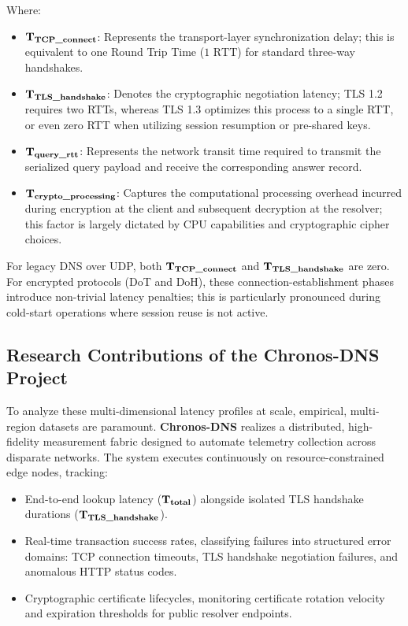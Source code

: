 \documentclass[10pt,journal,compsoc]{IEEEtran}
\begin{document}
Where:
\begin{itemize}
    \item $\mathbf{T_{\text{\textbf{TCP\_connect}}}}$: Represents the transport-layer synchronization delay; this is equivalent to one Round Trip Time ($1\text{ RTT}$) for standard three-way handshakes.
    \item $\mathbf{T_{\text{\textbf{TLS\_handshake}}}}$: Denotes the cryptographic negotiation latency; TLS 1.2 requires two RTTs, whereas TLS 1.3 optimizes this process to a single RTT, or even zero RTT when utilizing session resumption or pre-shared keys.
    \item $\mathbf{T_{\text{\textbf{query\_rtt}}}}$: Represents the network transit time required to transmit the serialized query payload and receive the corresponding answer record.
    \item $\mathbf{T_{\text{\textbf{crypto\_processing}}}}$: Captures the computational processing overhead incurred during encryption at the client and subsequent decryption at the resolver; this factor is largely dictated by CPU capabilities and cryptographic cipher choices.
\end{itemize}

For legacy DNS over UDP, both $\mathbf{T_{\text{\textbf{TCP\_connect}}}}$ and $\mathbf{T_{\text{\textbf{TLS\_handshake}}}}$ are zero. For encrypted protocols (DoT and DoH), these connection-establishment phases introduce non-trivial latency penalties; this is particularly pronounced during cold-start operations where session reuse is not active.

\subsection{Research Contributions of the Chronos-DNS Project}
To analyze these multi-dimensional latency profiles at scale, empirical, multi-region datasets are paramount. \textbf{Chronos-DNS} realizes a distributed, high-fidelity measurement fabric designed to automate telemetry collection across disparate networks. The system executes continuously on resource-constrained edge nodes, tracking:
\begin{itemize}
    \item End-to-end lookup latency ($\mathbf{T_{\text{\textbf{total}}}}$) alongside isolated TLS handshake durations ($\mathbf{T_{\text{\textbf{TLS\_handshake}}}}$).
    \item Real-time transaction success rates, classifying failures into structured error domains: TCP connection timeouts, TLS handshake negotiation failures, and anomalous HTTP status codes.
    \item Cryptographic certificate lifecycles, monitoring certificate rotation velocity and expiration thresholds for public resolver endpoints.
\end{itemize}
\end{document}

